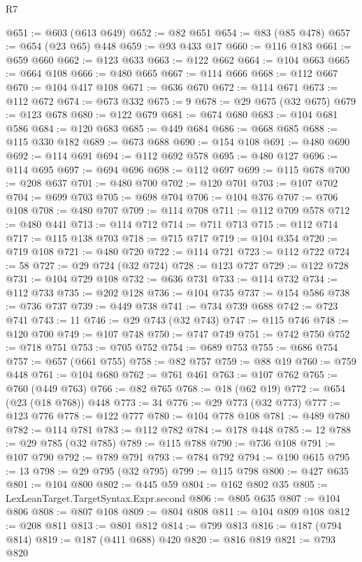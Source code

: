 \begin{lexlean}{R7}
\begin{coremodule}
@651 := @603 (@613 @649)
@652 := @82 @651
@654 := @83 (@85 @478)
@657 := @654 (@23 @65) @448
@659 := @93 @433 @17
@660 := @116 @183
@661 := @659 @660
@662 := @123 @633
@663 := @122 @662
@664 := @104 @663
@665 := @664 @108
@666 := @480 @665
@667 := @114 @666
@668 := @112 @667
@670 := @104 @417 @108
@671 := @636 @670
@672 := @114 @671
@673 := @112 @672
@674 := @673 @332
@675 := 9
@678 := @29 @675 (@32 @675)
@679 := @123 @678
@680 := @122 @679
@681 := @674 @680
@683 := @104 @681 @586
@684 := @120 @683
@685 := @449 @684
@686 := @668 @685
@688 := @115 @330 @182
@689 := @673 @688
@690 := @154 @108
@691 := @480 @690
@692 := @114 @691
@694 := @112 @692 @578
@695 := @480 @127
@696 := @114 @695
@697 := @694 @696
@698 := @112 @697
@699 := @115 @678
@700 := @208 @637
@701 := @480 @700
@702 := @120 @701
@703 := @107 @702
@704 := @699 @703
@705 := @698 @704
@706 := @104 @376
@707 := @706 @108
@708 := @480 @707
@709 := @114 @708
@711 := @112 @709 @578
@712 := @480 @441
@713 := @114 @712
@714 := @711 @713
@715 := @112 @714
@717 := @115 @138 @703
@718 := @715 @717
@719 := @104 @354
@720 := @719 @108
@721 := @480 @720
@722 := @114 @721
@723 := @112 @722
@724 := 58
@727 := @29 @724 (@32 @724)
@728 := @123 @727
@729 := @122 @728
@731 := @104 @729 @108
@732 := @636 @731
@733 := @114 @732
@734 := @112 @733
@735 := @202 @128
@736 := @104 @735
@737 := @154 @586
@738 := @736 @737
@739 := @449 @738
@741 := @734 @739 @688
@742 := @723 @741
@743 := 11
@746 := @29 @743 (@32 @743)
@747 := @115 @746
@748 := @120 @700
@749 := @107 @748
@750 := @747 @749
@751 := @742 @750
@752 := @718 @751
@753 := @705 @752
@754 := @689 @753
@755 := @686 @754
@757 := @657 (@661 @755)
@758 := @82 @757
@759 := @88 @19
@760 := @759 @448
@761 := @104 @680
@762 := @761 @461
@763 := @107 @762
@765 := @760 (@449 @763)
@766 := @82 @765
@768 := @18 (@62 @19)
@772 := @654 (@23 (@18 @768)) @448
@773 := 34
@776 := @29 @773 (@32 @773)
@777 := @123 @776
@778 := @122 @777
@780 := @104 @778 @108
@781 := @489 @780
@782 := @114 @781
@783 := @112 @782
@784 := @178 @448
@785 := 12
@788 := @29 @785 (@32 @785)
@789 := @115 @788
@790 := @736 @108
@791 := @107 @790
@792 := @789 @791
@793 := @784 @792
@794 := @190 @615
@795 := 13
@798 := @29 @795 (@32 @795)
@799 := @115 @798
@800 := @427 @635
@801 := @104 @800
@802 := @445 @59
@804 := @162 @802 @35
@805 := LexLeanTarget.TargetSyntax.Expr.second
@806 := @805 @635
@807 := @104 @806
@808 := @807 @108
@809 := @804 @808
@811 := @104 @809 @108
@812 := @208 @811
@813 := @801 @812
@814 := @799 @813
@816 := @187 (@794 @814)
@819 := @187 (@411 @688) @420
@820 := @816 @819
@821 := @793 @820

\end{coremodule}
\end{lexlean}
